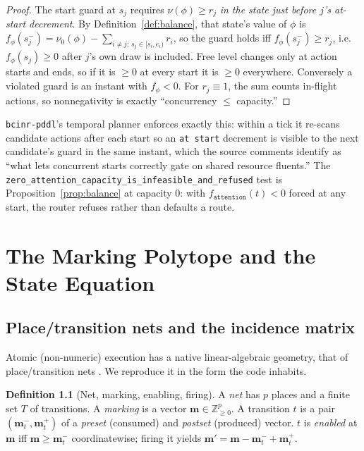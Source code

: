 \documentclass[11pt,oneside]{book}
\theoremstyle{definition}
\newtheorem{definition}{Definition}[chapter]
\theoremstyle{plain}
\theoremstyle{remark}
\newcommand{\Zplus}{\mathbb{Z}_{\ge 0}}
\newcommand{\code}[1]{\texttt{#1}}
\begin{document}
\begin{proof}
The start guard at $s_j$ requires $\nu(\phi)\ge r_j$ \emph{in the state just before $j$'s
at-start decrement}. By Definition~\ref{def:balance}, that state's value of $\phi$ is
$f_\phi(s_j^{-})=\nu_0(\phi)-\sum_{i\neq j:\,s_j\in[s_i,e_i)} r_i$, so the guard holds iff
$f_\phi(s_j^{-})\ge r_j$, i.e.\ $f_\phi(s_j)\ge 0$ after $j$'s own draw is included. Free level
changes only at action starts and ends, so if it is $\ge 0$ at every start it is $\ge 0$
everywhere. Conversely a violated guard is an instant with $f_\phi<0$. For $r_j\equiv 1$, the
sum counts in-flight actions, so nonnegativity is exactly ``concurrency $\le$ capacity.''
\end{proof}

\code{bcinr-pddl}'s temporal planner enforces exactly this: within a tick it re-scans
candidate actions after each start so an \code{at start} decrement is visible to the next
candidate's guard in the same instant, which the source comments identify as ``what lets
concurrent starts correctly gate on shared resource fluents.'' The
\code{zero\_attention\_capacity\_is\_infeasible\_and\_refused} test is
Proposition~\ref{prop:balance} at capacity $0$: with $f_{\code{attention}}(t)<0$ forced at any
start, the router refuses rather than defaults a route.

\chapter{The Marking Polytope and the State Equation}
\label{ch:polytope}

\section{Place/transition nets and the incidence matrix}

Atomic (non-numeric) execution has a native linear-algebraic geometry, that of place/transition
nets \cite{murata1989}. We reproduce it in the form the code inhabits.

\begin{definition}[Net, marking, enabling, firing]\label{def:net}
A \emph{net} has $p$ places and a finite set $T$ of transitions. A \emph{marking} is a vector
$\bm m\in\Zplus^{p}$. A transition $t$ is a pair $(\bm m^{-}_{t},\bm m^{+}_{t})$ of a
\emph{preset} (consumed) and \emph{postset} (produced) vector. $t$ is \emph{enabled} at $\bm
m$ iff $\bm m\ge\bm m^{-}_{t}$ coordinatewise; firing it yields
$\bm m'=\bm m-\bm m^{-}_{t}+\bm m^{+}_{t}$.
\end{definition}
\end{document}
